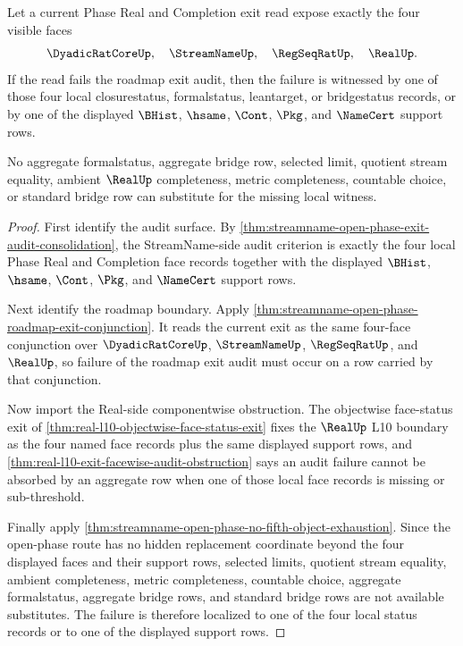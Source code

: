 \begin{theorem}
\label{thm:streamname-open-phase-face-status-obstruction-localization}
Let a current Phase Real and Completion exit read expose exactly the four visible faces
$$
\DyadicRatCoreUp,\quad \StreamNameUp,\quad \RegSeqRatUp,\quad \RealUp.
$$
If the read fails the roadmap exit audit, then the failure is witnessed by one of those four local closurestatus, formalstatus, leantarget, or bridgestatus records, or by one of the displayed $\BHist$, $\hsame$, $\Cont$, $\Pkg$, and $\NameCert$ support rows.

No aggregate formalstatus, aggregate bridge row, selected limit, quotient stream equality, ambient $\RealUp$ completeness, metric completeness, countable choice, or standard bridge row can substitute for the missing local witness.
\end{theorem}
\begin{proof}
First identify the audit surface. By \autoref{thm:streamname-open-phase-exit-audit-consolidation}, the StreamName-side audit criterion is exactly the four local Phase Real and Completion face records together with the displayed $\BHist$, $\hsame$, $\Cont$, $\Pkg$, and $\NameCert$ support rows.

Next identify the roadmap boundary. Apply \autoref{thm:streamname-open-phase-roadmap-exit-conjunction}. It reads the current exit as the same four-face conjunction over $\DyadicRatCoreUp$, $\StreamNameUp$, $\RegSeqRatUp$, and $\RealUp$, so failure of the roadmap exit audit must occur on a row carried by that conjunction.

Now import the Real-side componentwise obstruction. The objectwise face-status exit of \autoref{thm:real-l10-objectwise-face-status-exit} fixes the $\RealUp$ L10 boundary as the four named face records plus the same displayed support rows, and \autoref{thm:real-l10-exit-facewise-audit-obstruction} says an audit failure cannot be absorbed by an aggregate row when one of those local face records is missing or sub-threshold.

Finally apply \autoref{thm:streamname-open-phase-no-fifth-object-exhaustion}. Since the open-phase route has no hidden replacement coordinate beyond the four displayed faces and their support rows, selected limits, quotient stream equality, ambient completeness, metric completeness, countable choice, aggregate formalstatus, aggregate bridge rows, and standard bridge rows are not available substitutes. The failure is therefore localized to one of the four local status records or to one of the displayed support rows.
\end{proof}
